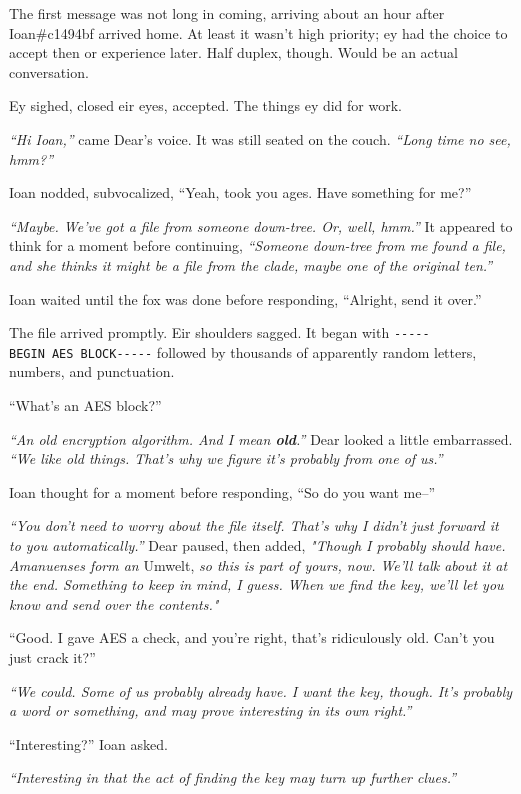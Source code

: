 The first message was not long in coming, arriving about an hour after Ioan\#c1494bf arrived home. At least it wasn't high priority; ey had the choice to accept then or experience later. Half duplex, though. Would be an actual conversation.

Ey sighed, closed eir eyes, accepted. The things ey did for work.

\emph{``Hi Ioan,''} came Dear's voice. It was still seated on the couch. \emph{``Long time no see, hmm?''}

Ioan nodded, subvocalized, ``Yeah, took you ages. Have something for me?''

\emph{``Maybe. We've got a file from someone down-tree. Or, well, hmm.''} It appeared to think for a moment before continuing, \emph{``Someone down-tree from me found a file, and she thinks it might be a file from the clade, maybe one of the original ten.''}

Ioan waited until the fox was done before responding, ``Alright, send it over.''

The file arrived promptly. Eir shoulders sagged. It began with \texttt{-\/-\/-\/-\/-BEGIN\ AES\ BLOCK-\/-\/-\/-\/-} followed by thousands of apparently random letters, numbers, and punctuation.

``What's an AES block?''

\emph{``An old encryption algorithm. And I mean \textbf{old}.''} Dear looked a little embarrassed. \emph{``We like old things. That's why we figure it's probably from one of us.''}

Ioan thought for a moment before responding, ``So do you want me--''

\emph{``You don't need to worry about the file itself. That's why I didn't just forward it to you automatically.''} Dear paused, then added, \emph{"Though I probably should have. Amanuenses form an} Umwelt, \emph{so this is part of yours, now. We'll talk about it at the end. Something to keep in mind, I guess. When we find the key, we'll let you know and send over the contents."}

``Good. I gave AES a check, and you're right, that's ridiculously old. Can't you just crack it?''

\emph{``We could. Some of us probably already have. I want the key, though. It's probably a word or something, and may prove interesting in its own right.''}

``Interesting?'' Ioan asked.

\emph{``Interesting in that the act of finding the key may turn up further clues.''}

